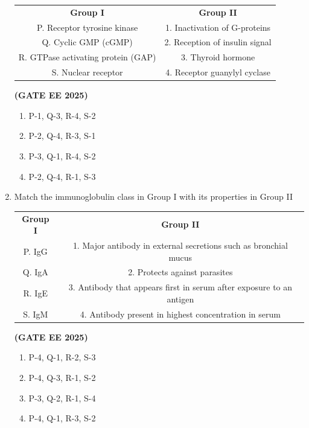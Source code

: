 \documentclass[journal,12pt,onecolumn]{IEEEtran}
\theoremstyle{remark}
\begin{document}
\begin{enumerate}
\begin{tabular}{c c}
\textbf{Group I} & \textbf{Group II} \\
P. Receptor tyrosine kinase & 1. Inactivation of G-proteins \\
Q. Cyclic GMP (cGMP) & 2. Reception of insulin signal \\
R. GTPase activating protein (GAP) & 3. Thyroid hormone \\
S. Nuclear receptor & 4. Receptor guanylyl cyclase \\
\end{tabular} \hfill \textbf{(GATE EE 2025)}
\begin{enumerate} 
\item P-1, Q-3, R-4, S-2
\item P-2, Q-4, R-3, S-1
\item P-3, Q-1, R-4, S-2
\item P-2, Q-4, R-1, S-3
\end{enumerate}

\item Match the immunoglobulin class in Group I with its properties in Group II\\
\begin{tabular}{c c}
\textbf{Group I} & \textbf{Group II} \\
P. IgG & 1. Major antibody in external secretions such as bronchial mucus \\
Q. IgA & 2. Protects against parasites \\
R. IgE & 3. Antibody that appears first in serum after exposure to an antigen \\
S. IgM & 4. Antibody present in highest concentration in serum \\

\end{tabular} \hfill \textbf{(GATE EE 2025)}
\begin{enumerate} 
\item P-4, Q-1, R-2, S-3
\item P-4, Q-3, R-1, S-2
\item P-3, Q-2, R-1, S-4
\item P-4, Q-1, R-3, S-2
\end{enumerate}




\end{enumerate}
\end{document}
